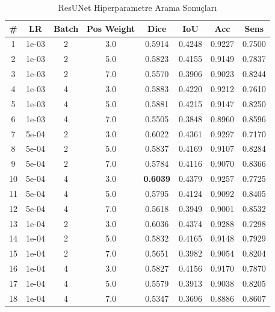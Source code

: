 \begin{table}[htbp]
\centering
\caption{ResUNet Hiperparametre Arama Sonuçları}
\label{tab:hyperparam_resunet}
\begin{tabular}{cccccccc}
\hline
\textbf{\#} & \textbf{LR} & \textbf{Batch} & \textbf{Pos Weight} & \textbf{Dice} & \textbf{IoU} & \textbf{Acc} & \textbf{Sens} \\
\hline
1 & 1e-03 & 2 & 3.0 & 0.5914 & 0.4248 & 0.9227 & 0.7500 \\
2 & 1e-03 & 2 & 5.0 & 0.5823 & 0.4155 & 0.9149 & 0.7837 \\
3 & 1e-03 & 2 & 7.0 & 0.5570 & 0.3906 & 0.9023 & 0.8244 \\
4 & 1e-03 & 4 & 3.0 & 0.5883 & 0.4220 & 0.9212 & 0.7610 \\
5 & 1e-03 & 4 & 5.0 & 0.5881 & 0.4215 & 0.9147 & 0.8250 \\
6 & 1e-03 & 4 & 7.0 & 0.5505 & 0.3848 & 0.8960 & 0.8596 \\
7 & 5e-04 & 2 & 3.0 & 0.6022 & 0.4361 & 0.9297 & 0.7170 \\
8 & 5e-04 & 2 & 5.0 & 0.5837 & 0.4169 & 0.9107 & 0.8284 \\
9 & 5e-04 & 2 & 7.0 & 0.5784 & 0.4116 & 0.9070 & 0.8366 \\
10 & 5e-04 & 4 & 3.0 & \textbf{0.6039} & 0.4379 & 0.9257 & 0.7725 \\
11 & 5e-04 & 4 & 5.0 & 0.5795 & 0.4124 & 0.9092 & 0.8405 \\
12 & 5e-04 & 4 & 7.0 & 0.5618 & 0.3949 & 0.9001 & 0.8532 \\
13 & 1e-04 & 2 & 3.0 & 0.6036 & 0.4374 & 0.9288 & 0.7298 \\
14 & 1e-04 & 2 & 5.0 & 0.5832 & 0.4165 & 0.9148 & 0.7929 \\
15 & 1e-04 & 2 & 7.0 & 0.5651 & 0.3982 & 0.9054 & 0.8204 \\
16 & 1e-04 & 4 & 3.0 & 0.5827 & 0.4156 & 0.9170 & 0.7870 \\
17 & 1e-04 & 4 & 5.0 & 0.5579 & 0.3913 & 0.9038 & 0.8205 \\
18 & 1e-04 & 4 & 7.0 & 0.5347 & 0.3696 & 0.8886 & 0.8607 \\
\hline
\end{tabular}
\end{table}

